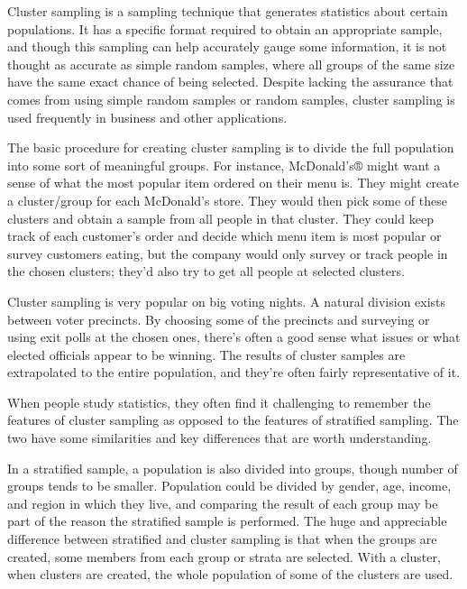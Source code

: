 

Cluster sampling is a sampling technique that generates statistics about certain populations. It has a specific format required to obtain an appropriate sample, and though this sampling can help accurately gauge some information, it is not thought as accurate as simple random samples, where all groups of the same size have the same exact chance of being selected. Despite lacking the assurance that comes from using simple random samples or random samples, cluster sampling is used frequently in business and other applications.

 

The basic procedure for creating cluster sampling is to divide the full population into some sort of meaningful groups. For instance, McDonald’s® might want a sense of what the most popular item ordered on their menu is. They might create a cluster/group for each McDonald’s store. They would then pick some of these clusters and obtain a sample from all people in that cluster. They could keep track of each customer’s order and decide which menu item is most popular or survey customers eating, but the company would only survey or track people in the chosen clusters; they’d also try to get all people at selected clusters.

 

Cluster sampling is very popular on big voting nights. A natural division exists between voter precincts. By choosing some of the precincts and surveying or using exit polls at the chosen ones, there’s often a good sense what issues or what elected officials appear to be winning. The results of cluster samples are extrapolated to the entire population, and they’re often fairly representative of it.

 

When people study statistics, they often find it challenging to remember the features of cluster sampling as opposed to the features of stratified sampling. The two have some similarities and key differences that are worth understanding.

 

In a stratified sample, a population is also divided into groups, though number of groups tends to be smaller. Population could be divided by gender, age, income, and region in which they live, and comparing the result of each group may be part of the reason the stratified sample is performed. The huge and appreciable difference between stratified and cluster sampling is that when the groups are created, some members from each group or strata are selected. With a cluster, when clusters are created, the whole population of some of the clusters are used.


